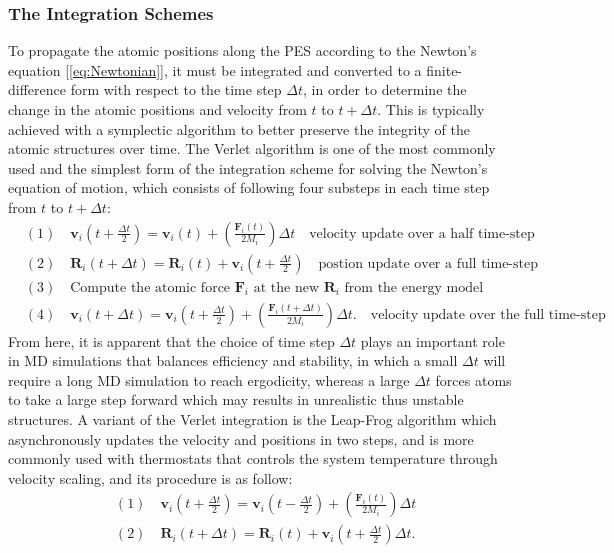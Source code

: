 \subsubsection{The Integration Schemes}
To propagate the atomic positions along the PES according to the Newton's equation [\cref{eq:Newtonian}], it must be integrated and converted to a finite-difference form with respect to the time step $\Delta t$, in order to determine the change in the atomic positions and velocity from $t$ to $t+\Delta t$. This is typically achieved with a symplectic algorithm to better preserve the integrity of the atomic structures over time. The Verlet algorithm is one of the most commonly used and the simplest form of the integration scheme for solving the Newton's equation of motion,\cite{verlet1967computer,swope1982computer} which consists of following four substeps in each time step from $t$ to $t+\Delta t$:
\begin{subequations}
    \begin{align}
        &(1) \quad \bm{v}_{i}\left(t+\frac{\Delta t}{2}\right) =\bm{v}_{i}(t)+\left(\frac{\bm{F}_i (t)}{2M_i}\right)\Delta t\quad \mbox{velocity update over a  half time-step} \label{eq:velocity_update_1}\\
        &(2) \quad \bm{R}_i (t+\Delta t)=\bm{R}_i (t)+\bm{v}_{i}\left(t+\frac{\Delta t}{2}\right) \quad \mbox{postion update over a full time-step}\label{eq:position_update}\\
        &(3) \quad \mbox{Compute the atomic force } \bm{F}_i \mbox{ at the new } \bm{R}_i  \mbox{ 
 from the energy model} \nonumber\\
        &(4) \quad \bm{v}_{i}(t+\Delta t)=\bm{v}_{i}\left(t+\frac{\Delta t}{2}\right) + \left(\frac{\bm{F}_{i}(t+\Delta t)}{2M_i}\right)\Delta t. \quad \mbox{velocity update over the full time-step} \label{eq:velocity_update_2}
    \end{align}
\end{subequations}
From here, it is apparent that the choice of time step $\Delta t$ plays an important role in MD simulations that balances efficiency and stability, in which a small $\Delta t$ will require a long MD simulation to reach ergodicity, whereas a large $\Delta t$ forces atoms to take a large step forward which may results in unrealistic thus unstable structures. A variant of the Verlet integration is the Leap-Frog algorithm\cite{allen2017computersimulationofliquid} which asynchronously updates the velocity and positions in two steps, and is more commonly used with thermostats that controls the system temperature through velocity scaling, and its procedure is as follow:
\begin{subequations}
    \begin{align}
        &(1)\quad \bm{v}_{i}\left(t+\frac{\Delta t}{2}\right)=\bm{v}_{i}\left(t-\frac{\Delta t}{2}\right)+\left(\frac{\bm{F}_i (t)}{2M_i} \right)\Delta t\label{eq:LP_velocity_update}\\
        &(2)\quad   \bm{R}_i (t+\Delta t) =\bm{R}_i (t)+\bm{v}_{i}\left(t+\frac{\Delta t}{2}\right) \Delta t.
    \end{align}
\end{subequations}

